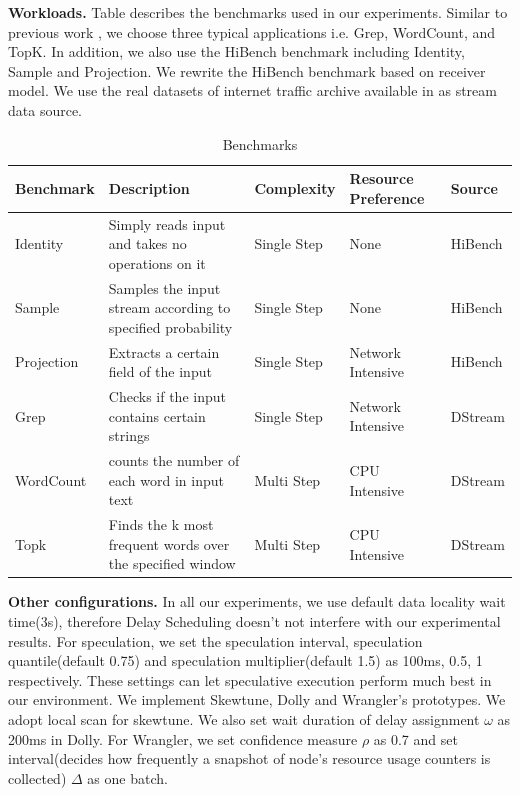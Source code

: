 \documentclass[10pt,conference,compsocconf,letterpaper]{IEEEtran}
\begin{document}
  \textbf{Workloads.} Table \uppercase\expandafter{} describes the benchmarks used in our experiments. Similar to previous work \cite{Zaharia2013}, we choose three typical applications i.e. Grep, WordCount, and TopK. In addition, we also use the HiBench \cite{HiBench} benchmark including Identity, Sample and Projection. We rewrite the HiBench \cite{HiBench} benchmark based on receiver model. We use the real datasets of internet traffic archive available in \cite{datasets} as stream data source.
  \begin{table}[htbp]
    \footnotesize
    \centering
    \caption{Benchmarks}
    \begin{threeparttable}
    \centering
      \begin{tabular}{|p{1.4cm}|p{7.2cm}|p{1.5cm}|p{2.8cm}|p{1.7cm}|}
        \hline
        \centering
        \textbf{Benchmark} & \textbf{Description} & \textbf{Complexity} & \textbf{Resource Preference} & \textbf{Source} \\
        \hline
        Identity & Simply reads input and takes no operations on it & Single Step & None & HiBench \cite{HiBench} \\
        \hline
        Sample & Samples the input stream according to specified probability & Single Step & None & HiBench \cite{HiBench} \\
        \hline
        Projection & Extracts a certain field of the input & Single Step & Network Intensive & HiBench \cite{HiBench} \\
        \hline
        Grep & Checks if the input contains certain strings & Single Step & Network Intensive & DStream \cite{Zaharia2013} \\
        \hline
        WordCount & counts the number of each word in input text & Multi Step & CPU Intensive & DStream \cite{Zaharia2013} \\
        \hline
        Topk & Finds the k most frequent words over the specified window & Multi Step & CPU Intensive & DStream \cite{Zaharia2013} \\
        \hline
      \end{tabular}
    \end{threeparttable}
    \label{Table2}
  \end{table}

  \textbf{Other configurations.} In all our experiments, we use default data locality wait time(3s), therefore Delay Scheduling \cite{Zaharia2010B} doesn't not interfere with our experimental results. For speculation, we set the speculation interval, speculation quantile(default 0.75) and speculation multiplier(default 1.5) as 100ms, 0.5, 1 respectively. These settings can let speculative execution perform much best in our environment. We implement Skewtune, Dolly and Wrangler's prototypes. We adopt local scan for skewtune. We also set wait duration of delay assignment $\omega$ as 200ms in Dolly. For Wrangler, we set confidence measure $\rho$ as 0.7 and set interval(decides how frequently a snapshot of node's resource usage counters is collected) $\Delta$ as one batch.
\end{document}
